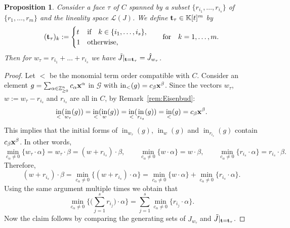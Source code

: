 \documentclass[pdftex]{sigma}%
\newtheorem{Proposition}[Theorem]{Proposition}
\numberwithin{equation}{section}
\DeclareMathOperator{\init}{in}
\begin{document}
\begin{Proposition}
Consider a face $\tau$ of $C$ spanned by a subset $\{r_{i_1},\dots,r_{i_s}\}$ of $\{r_1,\dots,r_m\}$ and the lineality space $\mathcal L(J)$.
We define ${\bf t}_\tau\in \mathbb K[t]^{m}$ by
\begin{displaymath}
({\bf t}_\tau)_k:= \begin{cases}t& \text{if}\quad k\in\{i_1,\ldots,i_s\},
\\
1 &\text{otherwise,}
\end{cases}
\qquad
\text{for}
\quad k=1,\ldots,m.
\end{displaymath}
Then for $w_\tau=r_{i_1}+\dots +r_{i_s}$ we have $\tilde J\vert_{{\bf t}={\bf t}_\tau}=\hat J_{w_\tau}$.
\end{Proposition}
\begin{proof}
Let $<$ be the monomial term order compatible with $C$. Consider an element $g=\sum_{\alpha \in \mathbb Z^n_{\ge 0}}c_{\alpha}{\bf x}^{\alpha}$ in $\mathcal{G}$ with $\init_<(g)=c_\beta {\bf x}^\beta$. Since the vectors $w_\tau$, $w:=w_\tau-r_{i_s}$ and $r_{i_s}$ are all in $C$, by Remark~\ref{rem:Eisenbud}:
\begin{equation*}%
\init_<(\init_{w_\tau}(g))=\init_<(\init_{w}(g))=\init_{<}(\init_{r_{i_s}}(g))=\init_<(g)=c_\beta {\bf x}^\beta.
\end{equation*}
This implies that the initial forms of $\init_{w_\tau}(g)$, $\init_{w}(g)$ and $\init_{r_{i_s}}(g)$ contain %
$c_\beta {\bf x}^\beta$. In other words,
\begin{displaymath}
\min_{c_{\alpha}\not =0}\{w_\tau\cdot \alpha\}=w_\tau\cdot\beta=(w+r_{i_s})\cdot \beta, \qquad \min_{c_{\alpha}\not =0}\{w\cdot \alpha\}=w\cdot\beta,\qquad \min_{c_{\alpha}\not =0}\{r_{i_s}\cdot \alpha\}=r_{i_s}\cdot\beta.
\end{displaymath}
Therefore,
\begin{displaymath}
(w+r_{i_s})\cdot\beta=\min_{c_{\alpha}\not =0}\{(w+r_{i_s})\cdot \alpha\} =\min_{ c_{\alpha}\not =0}\{w\cdot \alpha\} + \min_{c_{\alpha}\not =0} \{r_{i_s}\cdot \alpha\}.
\end{displaymath}
Using the same argument multiple times we obtain that
\begin{displaymath}
\min_{c_{\alpha}\not =0}\Bigg\{ \bigg(\sum_{j=1}^s r_{i_j}\bigg)\cdot \alpha \Bigg\} = \sum_{j=1}^s \min_{c_{\alpha}\not =0}\{r_{i_j}\cdot \alpha\}.
\end{displaymath}
Now the claim follows by comparing the generating sets of $\hat J_{w_\tau}$ and $\tilde J\vert_{{\bf t}={\bf t}_{\tau}}$.
\end{proof}
\end{document}
